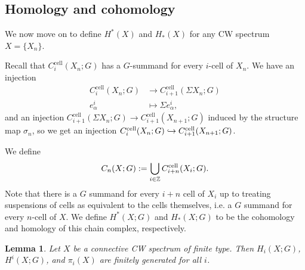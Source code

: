 \documentclass[11pt, titlepage]{article} %
\def\inj{\ensuremath\hookrightarrow}
\def\inte{\ensuremath\mathbb{Z}}
\numberwithin{equation}{subsection}
\theoremstyle{plain}
\newtheorem{lemma}[theorem]{Lemma}
\theoremstyle{definition}
\begin{document}
\subsection{Homology and cohomology}


We now move on to define \(H^*(X)\) and \(H_*(X)\) for any CW spectrum \(X=\{X_n\}\).

Recall that \(C^\text{cell}_i(X_n; G)\) has a \(G\)-summand for every \(i\)-cell of \(X_n\). We have an injection
\begin{align*}
C_i^\text{cell}(X_n;G) &\to C_{i+1}^\text{cell}(\Sigma X_n; G)\\
e^i_\alpha &\mapsto \Sigma e^i_\alpha,
\end{align*}
and an injection \(C^\text{cell}_{i+1}(\Sigma X_n; G)\to C^\text{cell}_{i+1}(X_{n+1}; G)\) induced by the structure map \(\sigma_n\), so we get an injection \(C^\text{cell}_i(X_n;G)\inj C^\text{cell}_{i+1}(X_{n+1};G)\).

We define
\[C_n(X ; G):=\bigcup_{i\in \inte}C^\text{cell}_{i+n}(X_i; G).\] 
Note that there is a \(G\) summand for every \(i+n\) cell of \(X_i\) up to treating suspensions of cells as equivalent to the cells themselves, i.e. a \(G\) summand for every \(n\)-cell of \(X\). We define \(H^*(X;G)\) and \(H_*(X;G)\) to be the cohomology and homology of this chain complex, respectively.

\begin{lemma}\label{2504141556}
Let \(X\) be a connective CW spectrum of finite type. Then \(H_i(X;G)\), \(H^i(X;G)\), and \(\pi_i(X)\) are finitely generated for all \(i\). 
\end{lemma}
\end{document}
